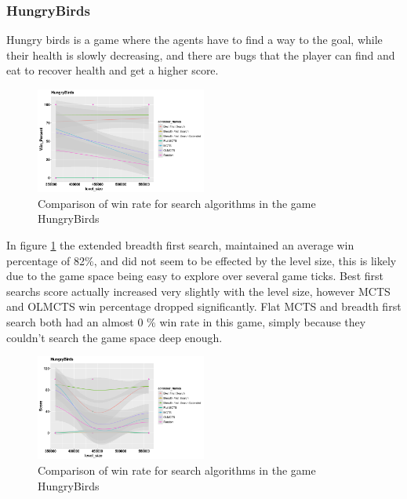 \documentclass[journal]{IEEEtran}
\begin{document}
		\subsubsection{HungryBirds}
		Hungry birds is a game where the agents have to find a way to the goal, while their health is slowly decreasing, and there are bugs that the player can find and eat to recover health and get a higher score.
		\begin{figure}[h]
		    \centering
		    \includegraphics[width=0.5\textwidth]{Scatter/game_4_win_confidence}
		    \caption{ Comparison of win rate for search algorithms in the game HungryBirds }
		    \label{fig:game_4_win_confidence}
		\end{figure}
		In figure \ref{fig:game_4_win_confidence} the extended breadth first search, maintained an average win percentage of 82\%, and did not seem to be effected by the level size, this is likely due to the game space being easy to explore over several game ticks.
		Best first searchs score actually increased very slightly with the level size, however MCTS and OLMCTS win percentage dropped significantly.
		Flat MCTS and breadth first search both had an almost 0 \% win rate in this game, simply because they couldn't search the game space deep enough.

		\begin{figure}[h]
		    \centering
		    \includegraphics[width=0.5\textwidth]{Scatter/game_4_Score_smoothing_confidence}
		    \caption{ Comparison of win rate for search algorithms in the game HungryBirds }
		    \label{fig:game_4_score_confidence}
		\end{figure}
\end{document}
